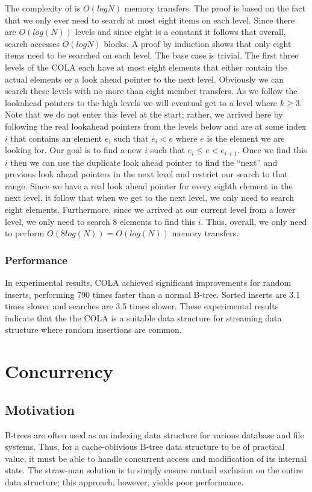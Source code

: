 \documentclass{style}
\begin{document}
The complexity of \Search is $O(log N)$ memory transfers. The proof is based
on the fact that we only ever need to search at most eight items on each
level. Since there are $O(log(N))$ levels and since eight is a constant it
follows that overall, search accesses $O(log N)$ blocks. A proof by induction
shows that only eight items need to be searched on each level. The base case
is trivial. The first three levels of the COLA each have at most eight
elements that either contain the actual elements or a look ahead pointer to
the next level. Obviously we can search these levels with no more than eight
member transfers. As we follow the lookahead pointers to the high levels we
will eventual get to a level where $k \geq 3$. Note that we do not enter this
level at the start; rather, we arrived here by following the real lookahead
pointers from the levels below and are at some index $i$ that contains an
element $e_i$ such that $e_i < e$ where $e$ is the element we are looking for.
Our goal is to find a new $i$ such that $e_i \leq e < e_{i+1}$. Once we find
this $i$ then we can use the duplicate look ahead pointer to find the ``next''
and previous look ahead pointers in the next level and restrict our search to
that range. Since we have a real look ahead pointer for every eighth element
in the next level, it follow that when we get to the next level, we only need
to search eight elements. Furthermore, since we arrived at our current level
from a lower level, we only need to search $8$ elements to find this $i$.
Thus, overall, we only need to perform $O(8log(N)) = O(log(N))$ memory
transfers.

\subsubsection{Performance}

In experimental results, COLA achieved significant improvements for random
inserts, performing 790 times faster than a normal B-tree. Sorted inserts are
3.1 times slower and searches are 3.5 times slower. These experimental results
indicate that the the COLA is a suitable data structure for streaming data
structure where random insertions are common.

\section{Concurrency}

\subsection{Motivation}
B-trees are often used as an indexing data structure for various
database and file systems. Thus, for a cache-oblivious B-tree data structure
to be of practical value, it must be able to handle concurrent access and modification
of its internal state. The straw-man solution is to simply ensure mutual exclusion
on the entire data structure; this approach, however, yields poor performance.
\end{document}
